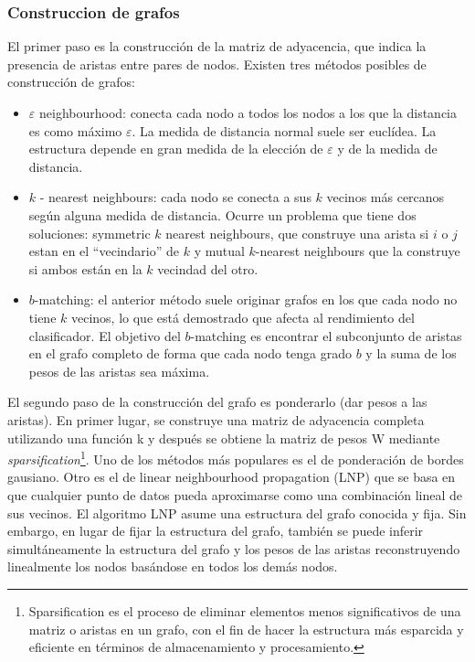 \subsubsection{Construccion de grafos}
El primer paso es la construcción de la matriz de adyacencia, que indica la presencia de aristas entre pares de nodos. Existen tres métodos posibles de construcción de grafos:
\begin{itemize}
	\item $\varepsilon$ neighbourhood: conecta cada nodo a todos los nodos a los que la distancia es como máximo $\varepsilon$. La medida de distancia normal suele ser euclídea. La estructura depende en gran medida de la elección de $\varepsilon$ y de la medida de distancia.
	
	\item $k$ - nearest neighbours: cada nodo se conecta a sus $k$ vecinos más cercanos según alguna medida de distancia. Ocurre un problema que tiene dos soluciones: symmetric $k$ nearest neighbours, que construye una arista si $i$ o $j$ estan en el “vecindario” de $k$ y mutual $k$-nearest neighbours que la construye si ambos están en la $k$ vecindad del otro.
	
	\item $b$-matching: el anterior método suele originar grafos en los que cada nodo no tiene $k$ vecinos, lo que está demostrado que afecta al rendimiento del clasificador. El objetivo del $b$-matching es encontrar el subconjunto de aristas en el grafo completo de forma que cada nodo tenga grado $b$ y la suma de los pesos de las aristas sea máxima.
\end{itemize}

El segundo paso de la construcción del grafo es ponderarlo (dar pesos a las aristas). En primer lugar, se construye una matriz de adyacencia completa utilizando una función k y después se obtiene la matriz de pesos W mediante \textit{sparsification}\footnote{Sparsification es el proceso de eliminar elementos menos significativos de una matriz o aristas en un grafo, con el fin de hacer la estructura más esparcida y eficiente en términos de almacenamiento y procesamiento.}. Uno de los métodos más populares es el de ponderación de bordes gausiano. Otro es el de linear neighbourhood propagation (LNP) que se basa en que cualquier punto de datos pueda aproximarse como una combinación lineal de sus vecinos.
El algoritmo LNP asume una estructura del grafo conocida y fija. Sin embargo, en lugar de fijar la estructura del grafo, también se puede inferir simultáneamente la estructura del grafo y los pesos de las aristas reconstruyendo linealmente los nodos basándose en todos los demás nodos.


